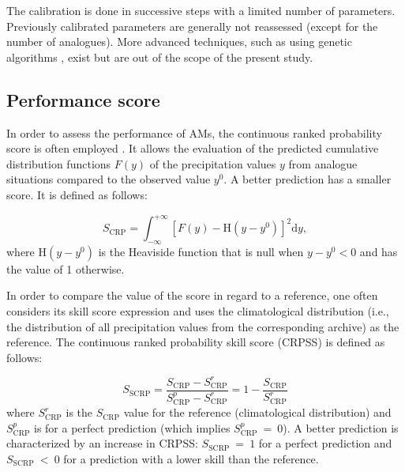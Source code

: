 \documentclass[hess, manuscript]{copernicus}
\begin{document}
	The calibration is done in successive steps with a limited number of parameters. Previously calibrated parameters are generally not reassessed (except for the number of analogues). More advanced techniques, such as using genetic algorithms \citep{Horton2016}, exist but are out of the scope of the present study.
	
	
	\subsection{Performance score}
	\label{sec:performance}
	
	In order to assess the performance of AMs, the continuous ranked probability score \citep[CRPS,][]{Brown1974, Matheson1976, Hersbach2000} is often employed \citep[see, e.g.,][]{Bontron2004, Bontron2005, BenDaoud2008, Horton2012, Marty2012, Radanovics2013, Chardon2014, Junk2015, BenDaoud2016, Caillouet2016}. It allows the evaluation of the predicted cumulative distribution functions $F(y)$ of the precipitation values $y$ from analogue situations compared to the observed value $y^{0}$. A better prediction has a smaller score. It is defined as follows:
	
	\begin{equation}
	\label{eq:CRPS}
	S_{\text{CRP}} = \int_{-\infty}^{+\infty} \left[ F(y)-\text{H}(y-y^{0})\right]^{2} \text{d}y ,  
	\end{equation}
	where $\text{H}(y-y^{0})$ is the Heaviside function that is null when $y-y^{0}<0$ and has the value of 1 otherwise.
	
	In order to compare the value of the score in regard to a reference, one often considers its skill score expression and uses the climatological distribution (i.e., the distribution of all precipitation values from the corresponding archive) as the reference. The continuous ranked probability skill score (CRPSS) is defined as follows:
	
	\begin{equation}
	\label{eq:CRPSS}
	S_{\text{SCRP}} = \frac{S_{\text{CRP}}-S_{\text{CRP}}^{r}}{S_{\text{CRP}}^{p}-S_{\text{CRP}}^{r}} = 1-\frac{S_{\text{CRP}}}{S_{\text{CRP}}^{r}}
	\end{equation}
	where $S_{\text{CRP}}^{r}$ is the $S_{\text{CRP}}$ value for the reference (climatological distribution) and $S_{\text{CRP}}^{p}$ is for a perfect prediction (which implies $S_{\text{CRP}}^{p}~=~0$). A better prediction is characterized by an increase in CRPSS: $S_{\text{SCRP}}~=~1$ for a perfect prediction and $S_{\text{SCRP}}~<~0$ for a prediction with a lower skill than the reference.
	
\end{document}
